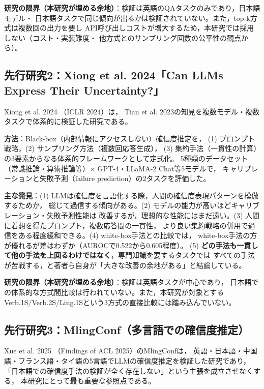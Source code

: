 \documentclass[11pt,a4paper,oneside]{article}
\begin{document}
\textbf{研究の限界（本研究が埋める余地）}：検証は英語のQAタスクのみであり，日本語モデル・
日本語タスクで同じ傾向が出るかは検証されていない。また，top-k方式は複数回の出力を要し
API呼び出しコストが増大するため，本研究では採用しない（コスト・実装難度・
他方式とのサンプリング回数の公平性の観点から）。

\subsection{先行研究2：Xiong et al. 2024「Can LLMs Express Their Uncertainty?」}

Xiong et al. 2024 \cite{xiong2024llmuncertainty}（ICLR 2024）は，
Tian et al. 2023の知見を複数モデル・複数タスクで体系的に検証した研究である。

\textbf{方法}：Black-box（内部情報にアクセスしない）確信度推定を，
(1) プロンプト戦略，(2) サンプリング方法（複数回応答生成），
(3) 集約手法（一貫性の計算）の3要素からなる体系的フレームワークとして定式化。
5種類のデータセット（常識推論・算術推論等）× GPT-4・LLaMA-2 Chat等5モデルで，
キャリブレーションと失敗予測（failure prediction）の2タスクを評価した。

\textbf{主な発見}：(1) LLMは確信度を言語化する際，人間の確信度表現パターンを模倣するためか，
総じて過信する傾向がある。(2) モデルの能力が高いほどキャリブレーション・失敗予測性能は
改善するが，理想的な性能にはまだ遠い。(3) 人間に着想を得たプロンプト，複数応答間の一貫性，
より良い集約戦略の併用で過信をある程度緩和できる。(4) white-box手法との比較では，
white-box手法の方が優れるが差はわずか（AUROCで0.522から0.605程度）。
(5) \textbf{どの手法も一貫して他の手法を上回るわけではなく}，専門知識を要するタスクでは
すべての手法が苦戦する，と著者ら自身が「大きな改善の余地がある」と結論している。

\textbf{研究の限界（本研究が埋める余地）}：検証は英語タスクが中心であり，
日本語での体系的な方式間比較は行われていない。また，本研究が対象とする
Verb.1S/Verb.2S/Ling.1Sという3方式の直接比較には踏み込んでいない。

\subsection{先行研究3：MlingConf（多言語での確信度推定）}

Xue et al. 2025 \cite{xue2025mlingconf}（Findings of ACL 2025）のMlingConfは，
英語・日本語・中国語・フランス語・タイ語の5言語でLLMの確信度推定を検証した研究であり，
「日本語での確信度手法の検証が全く存在しない」という主張を成立させなくする，
本研究にとって最も重要な参照点である。
\end{document}
